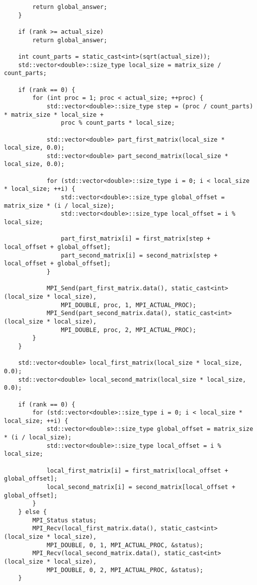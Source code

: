 \documentclass{report}
\begin{document}
\begin{lstlisting}
        return global_answer;
    }

    if (rank >= actual_size)
        return global_answer;

    int count_parts = static_cast<int>(sqrt(actual_size));
    std::vector<double>::size_type local_size = matrix_size / count_parts;

    if (rank == 0) {
        for (int proc = 1; proc < actual_size; ++proc) {
            std::vector<double>::size_type step = (proc / count_parts) * matrix_size * local_size +
                proc % count_parts * local_size;

            std::vector<double> part_first_matrix(local_size * local_size, 0.0);
            std::vector<double> part_second_matrix(local_size * local_size, 0.0);

            for (std::vector<double>::size_type i = 0; i < local_size * local_size; ++i) {
                std::vector<double>::size_type global_offset = matrix_size * (i / local_size);
                std::vector<double>::size_type local_offset = i % local_size;

                part_first_matrix[i] = first_matrix[step + local_offset + global_offset];
                part_second_matrix[i] = second_matrix[step + local_offset + global_offset];
            }

            MPI_Send(part_first_matrix.data(), static_cast<int>(local_size * local_size),
                MPI_DOUBLE, proc, 1, MPI_ACTUAL_PROC);
            MPI_Send(part_second_matrix.data(), static_cast<int>(local_size * local_size),
                MPI_DOUBLE, proc, 2, MPI_ACTUAL_PROC);
        }
    }

    std::vector<double> local_first_matrix(local_size * local_size, 0.0);
    std::vector<double> local_second_matrix(local_size * local_size, 0.0);

    if (rank == 0) {
        for (std::vector<double>::size_type i = 0; i < local_size * local_size; ++i) {
            std::vector<double>::size_type global_offset = matrix_size * (i / local_size);
            std::vector<double>::size_type local_offset = i % local_size;

            local_first_matrix[i] = first_matrix[local_offset + global_offset];
            local_second_matrix[i] = second_matrix[local_offset + global_offset];
        }
    } else {
        MPI_Status status;
        MPI_Recv(local_first_matrix.data(), static_cast<int>(local_size * local_size),
            MPI_DOUBLE, 0, 1, MPI_ACTUAL_PROC, &status);
        MPI_Recv(local_second_matrix.data(), static_cast<int>(local_size * local_size),
            MPI_DOUBLE, 0, 2, MPI_ACTUAL_PROC, &status);
    }


\end{lstlisting}
\end{document}
